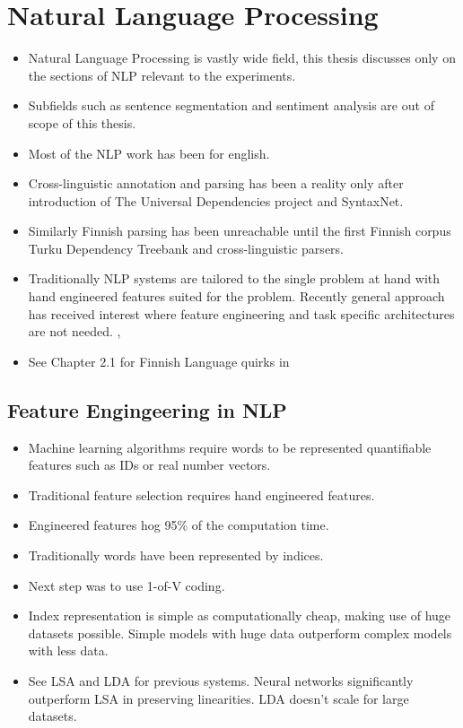 \documentclass[12pt,a4paper,english
]{tutthesis}
\begin{document}
\chapter{Natural Language Processing}
\label{ch:natural_language_processing}
\begin{itemize}
\item Natural Language Processing is vastly wide field, this thesis discusses only on the sections of NLP relevant to the experiments.
\item Subfields such as sentence segmentation and sentiment analysis are out of scope of this thesis.
\item Most of the NLP work has been for english.
\item Cross-linguistic annotation and parsing has been a reality only after introduction of The Universal Dependencies project and SyntaxNet.
\item Similarly Finnish parsing has been unreachable until the first Finnish corpus Turku Dependency Treebank \cite{Haverinen2014} and cross-linguistic parsers.
\item Traditionally NLP systems are tailored to the single problem at hand with hand engineered features suited for the problem. Recently general approach has received interest where feature engineering and task specific architectures are not needed. \cite{Collobert2011}, \cite{Zhang2015}
\item See Chapter 2.1 for Finnish Language quirks in \cite{Korenius2004}
\end{itemize}

\section{Feature Engingeering in NLP}
\label{ch:feature_engineering_in_nlp}
\begin{itemize}
\item Machine learning algorithms require words to be represented quantifiable features such as IDs or real number vectors.
\item Traditional feature selection requires hand engineered features.
\item Engineered features hog 95\% of the computation time. \cite{Chen2014}
\item Traditionally words have been represented by indices. \cite{Mikolov2013}
\item Next step was to use 1-of-V coding.
\item Index representation is simple as computationally cheap, making use of huge datasets possible. Simple models with huge data outperform complex models with less data. \cite{Mikolov2013}
\item See LSA and LDA for previous systems. Neural networks significantly outperform LSA in preserving linearities. LDA doesn't scale for large datasets. \cite{Mikolov2013}
\end{itemize}
\end{document}
